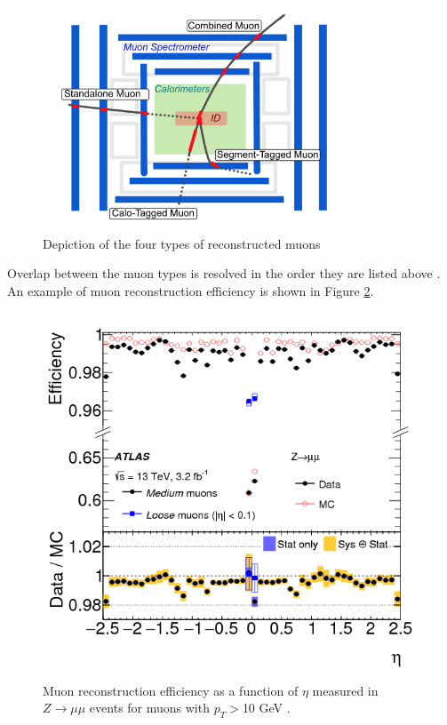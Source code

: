 \begin{figure}[htb!]
    \centering
    \includegraphics[width=3.5in]{figures/chapter3/muon_types.png}
    \caption{Depiction of the four types of reconstructed muons}
    \label{fig:muon_types}
\end{figure}

Overlap between the muon types is resolved in the order they are listed above \cite{muons_run2}. An example of muon reconstruction efficiency is shown in Figure \ref{fig:muon_reco}.

\begin{figure}[htb!]
    \centering
    \includegraphics[width=4.5in]{figures/chapter3/muon_reco_perf.png}
    \caption{Muon reconstruction efficiency as a function of $\eta$ measured in $Z\rightarrow \mu\mu$ events for muons with $p_T>$10 GeV \cite{muons_run2}.}
    \label{fig:muon_reco}
\end{figure}

